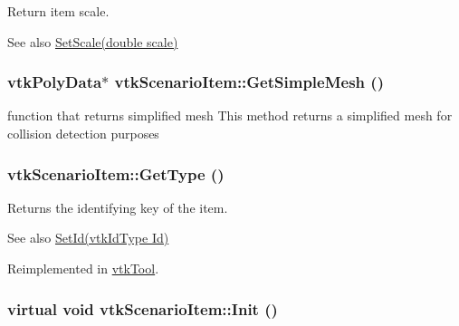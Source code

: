 Return item scale. \begin{DoxySeeAlso}{See also}
\hyperlink{classvtkScenarioItem_a4d199d1138fbfe835c36cd20efbedb1e}{SetScale(double scale)} 
\end{DoxySeeAlso}
\hypertarget{classvtkScenarioItem_a1c8a6fcb05ff01e2fda8034078f46236}{
\subsubsection[{GetSimpleMesh}]{\setlength{\rightskip}{0pt plus 5cm}vtkPolyData$\ast$ vtkScenarioItem::GetSimpleMesh ()}}
\label{classvtkScenarioItem_a1c8a6fcb05ff01e2fda8034078f46236}


function that returns simplified mesh This method returns a simplified mesh for collision detection purposes \hypertarget{classvtkScenarioItem_ae0fec908b834864a99e2907e57c71081}{
\subsubsection[{GetType}]{ vtkScenarioItem::GetType ()}}
\label{classvtkScenarioItem_ae0fec908b834864a99e2907e57c71081}


Returns the identifying key of the item. \begin{DoxySeeAlso}{See also}
\hyperlink{classvtkScenarioItem_afd99a6db7187837d0129e9898478ec60}{SetId(vtkIdType Id)} 
\end{DoxySeeAlso}


Reimplemented in \hyperlink{classvtkTool_ab09b1fa6f511ca80859b3e59cedd62de}{vtkTool}.\hypertarget{classvtkScenarioItem_a87f01894de62f23433aa2eb3f995c216}{
\subsubsection[{Init}]{\setlength{\rightskip}{0pt plus 5cm}virtual void vtkScenarioItem::Init ()}}
\label{classvtkScenarioItem_a87f01894de62f23433aa2eb3f995c216}


